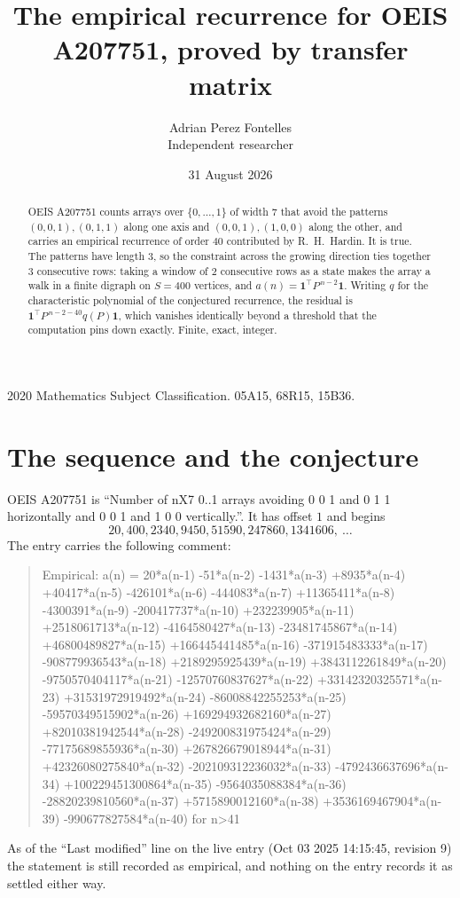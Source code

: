 \documentclass[11pt,a4paper]{article}
\title{The empirical recurrence for OEIS A207751, proved by transfer matrix}
\author{Adrian Perez Fontelles\\ \small Independent researcher}
\date{31 August 2026}
\theoremstyle{plain}
\theoremstyle{definition}
\begin{document}
\maketitle

\begin{abstract}
OEIS A207751 counts arrays over $\{0,\dots,1\}$ of width $7$ that avoid the patterns
$(0,0,1), (0,1,1)$ along one axis and $(0,0,1), (1,0,0)$ along the other, and carries an empirical recurrence of
order $40$ contributed by R.~H.~Hardin. It is true. The patterns have length $3$, so
the constraint across the growing direction ties together $3$ consecutive rows: taking a
window of $2$ consecutive rows as a state makes the array a walk in a finite digraph
on $S=400$ vertices, and $a(n)=\mathbf{1}^{\!\top}P^{\,n-2}\mathbf{1}$. Writing $q$
for the characteristic polynomial of the conjectured recurrence, the residual is
$\mathbf{1}^{\!\top}P^{\,n-2-40}q(P)\mathbf{1}$, which vanishes identically
beyond a threshold that the computation pins down exactly. Finite, exact, integer.
\end{abstract}

\noindent\small 2020 Mathematics Subject Classification. 05A15, 68R15, 15B36.\normalsize

\section{The sequence and the conjecture}

OEIS A207751 is ``Number of nX7 0..1 arrays avoiding 0 0 1 and 0 1 1 horizontally and 0 0 1 and 1 0 0 vertically.''. It has offset
$1$ and begins
\[
20, 400, 2340, 9450, 51590, 247860, 1341606,\ \dots
\]
The entry carries the following comment:
\begin{quote}\small
Empirical: a(n) = 20*a(n-1) -51*a(n-2) -1431*a(n-3) +8935*a(n-4) +40417*a(n-5) -426101*a(n-6) -444083*a(n-7) +11365411*a(n-8) -4300391*a(n-9) -200417737*a(n-10) +232239905*a(n-11) +2518061713*a(n-12) -4164580427*a(n-13) -23481745867*a(n-14) +46800489827*a(n-15) +166445441485*a(n-16) -371915483333*a(n-17) -908779936543*a(n-18) +2189295925439*a(n-19) +3843112261849*a(n-20) -9750570404117*a(n-21) -12570760837627*a(n-22) +33142320325571*a(n-23) +31531972919492*a(n-24) -86008842255253*a(n-25) -59570349515902*a(n-26) +169294932682160*a(n-27) +82010381942544*a(n-28) -249200831975424*a(n-29) -77175689855936*a(n-30) +267826679018944*a(n-31) +42326080275840*a(n-32) -202109312236032*a(n-33) -4792436637696*a(n-34) +100229451300864*a(n-35) -9564035088384*a(n-36) -28820239810560*a(n-37) +5715890012160*a(n-38) +3536169467904*a(n-39) -990677827584*a(n-40) for n>41
\end{quote}
As of the ``Last modified'' line on the live entry (Oct 03 2025 14:15:45, revision
9) the statement is still recorded as empirical, and nothing on the entry
records it as settled either way.
\end{document}
